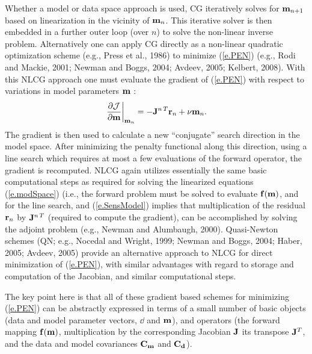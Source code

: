 Whether a model or data space approach is used,
CG iteratively solves for ${\bf m}_{n+1}$ 
based on linearization in the vicinity of ${\bf m}_n$.
This iterative solver is then embedded in a
further outer loop (over $n$) 
to solve the non-linear inverse problem. 
Alternatively one can apply
CG directly as a non-linear quadratic optimization scheme 
(e.g., Press et al., 1986)
to minimize (\ref{e.PEN}) (e.g., Rodi and Mackie, 2001; 
Newman and Boggs, 2004; Avdeev, 2005; Kelbert, 2008).  With this
NLCG approach one must evaluate the gradient of (\ref{e.PEN})
with respect to variations in model parameters ${\bf m}$ :
\begin{equation}
\label{e.Grad}
\left. \frac{\partial {\cal J}} {\partial {\bf m}} \right |_{{\bf m}_n}  = 
- {\bf J}^{n\,T} {\bf r}_n  + \nu {\bf m}_n   .
\end{equation}
The gradient is then used to calculate a new ``conjugate''
search direction in the model space.  After minimizing
the penalty functional along this direction,
using a line search which requires at most a few evaluations
of the forward operator, the gradient is recomputed.
NLCG again utilizes essentially the same
basic computational steps as required for solving
the linearized equations (\ref{e.modSpace}) (i.e.,
the forward problem must be solved to evaluate ${\bf f}({\bf m})$,
and for the line search,
and (\ref{e.SensModel}) implies that
multiplication of the residual ${\bf r}_n$ by ${\bf J}^{n\,T}$
(required to compute the gradient),
can be accomplished by solving the adjoint problem
(e.g., Newman and Alumbaugh, 2000).
Quasi-Newton schemes (QN; e.g., Nocedal and Wright, 1999; Newman and Boggs, 2004;
Haber, 2005; Avdeev, 2005) provide an alternative
approach to NLCG for direct minimization of (\ref{e.PEN}),
with similar advantages with regard to storage and computation
of the Jacobian, and similar computational steps.

The key point here is that
all of these gradient based schemes for minimizing
(\ref{e.PEN}) can be abstractly expressed in terms of
a small number of basic objects 
(data and model parameter vectors, $\dd$ and ${\bf m}$), and
operators (the forward mapping ${\bf f}({\bf m})$, 
multiplication by the corresponding Jacobian ${\bf J}$
its transpose ${\bf J}^T$,
and the data and model covariances ${\bf C_m}$ and ${\bf C_d}$).

